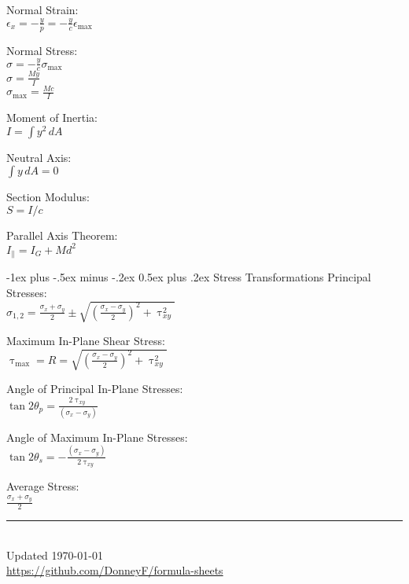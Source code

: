 \documentclass[10pt,landscape]{article}
\makeatletter
\renewcommand{\section}{\@startsection{section}{1}{0mm}%
                                {-1ex plus -.5ex minus -.2ex}%
                                {0.5ex plus .2ex}%
                                {\normalfont\large\bfseries}}
\newcommand{\tab}{\hspace{.02\textwidth}}
\newcommand{\ds}{\displaystyle}
\makeatother
\begin{document}
\begin{multicols}{3}
Normal Strain:\\
\vspace{1mm}
\tab $\ds \epsilon_{x} = -\frac{y}{p} = -\frac{y}{c}\epsilon_{\text{max}}$

Normal Stress:\\
\vspace{1mm}
\tab $\ds \sigma = -\frac{y}{c}\sigma_{\text{max}}$\\
\vspace{1mm}
\tab $\ds \sigma = \frac{My}{I}$\\
\vspace{1mm}
\tab $\ds \sigma_{\text{max}} = \frac{Mc}{I}$

Moment of Inertia:\\
\tab $I = \int y^2\,dA$

Neutral Axis:\\
\tab $\int y\,dA = 0$

Section Modulus:\\
\tab $S = I/c$

Parallel Axis Theorem:\\
\tab $I_{\parallel} = I_G + Md^2$

\section{Stress Transformations}
Principal Stresses:\\
\tab $\ds \sigma_{1,2} = \frac{\sigma_x + \sigma _y}{2} \pm \sqrt{\left(\frac{\sigma_x - \sigma_y}{2}\right)^2 + \uptau_{xy}^2}$

Maximum In-Plane Shear Stress:\\
\vspace{1mm}
\tab $\uptau_{\text{max}} = R = \sqrt{\left(\frac{\sigma_x - \sigma_y}{2}\right)^2 + \uptau_{xy}^2}$

Angle of Principal In-Plane Stresses:\\
\tab $\ds \tan 2\theta_p = \frac{2\uptau_{xy}}{(\sigma_x - \sigma_y)}$

Angle of Maximum In-Plane Stresses:\\
\tab $\ds \tan 2\theta_s = -\frac{(\sigma_x - \sigma_y)}{2\uptau_{xy}}$

Average Stress:\\
\tab $\ds \frac{\sigma_x + \sigma_y}{2}$

\rule{0.3\linewidth}{0.25pt}
\scriptsize\\
Updated \today\\
\href{https://github.com/DonneyF/formula-sheets}{https://github.com/DonneyF/formula-sheets}

\end{multicols}
\end{document}
